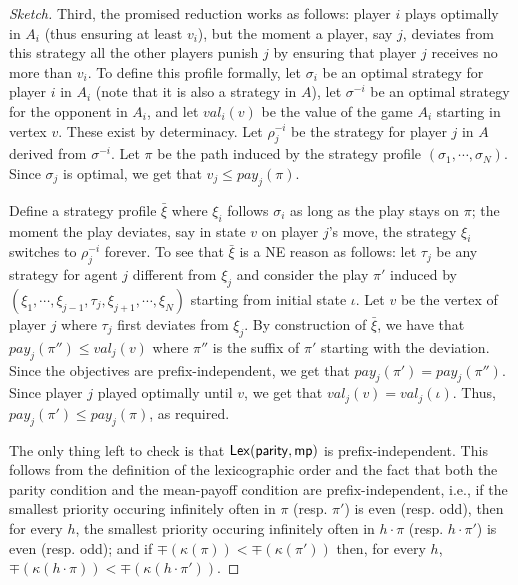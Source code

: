 \begin{proof}[Sketch]
Third, the promised reduction works as follows: player $i$ plays optimally in $A_i$ (thus ensuring at least $v_i$), but the moment a player, say $j$, deviates from this strategy all the other players punish $j$ by ensuring that player $j$ receives no more than $v_i$. To define this profile formally, let 
$\sigma_i$ be an optimal strategy for player $i$ in $A_i$ (note that it is also a strategy in $A$), 
let $\sigma^{-i}$ be an optimal strategy for the opponent in $A_i$, and let 
$val_i(v)$ be the value of the game $A_i$ starting in vertex $v$. These exist by determinacy. 
Let $\rho_j^{-i}$ be the strategy for player $j$ in $A$ derived from $\sigma^{-i}$. Let $\pi$ be the path induced by the strategy profile $(\sigma_1, \cdots, \sigma_N)$. Since $\sigma_j$ is optimal, we get that $v_j \leq pay_j(\pi)$.  

Define a strategy profile $\bar{\xi}$ where $\xi_i$ follows $\sigma_i$ as long as the play stays on $\pi$; the moment the play deviates, say in state $v$ on player $j$'s move, the strategy $\xi_i$ switches to $\rho_j^{-i}$ forever. To see that $\bar{\xi}$ is a NE reason as follows: let $\tau_j$ be any strategy for agent $j$ different from $\xi_j$ and consider the play $\pi'$ induced by $(\xi_1, \cdots, \xi_{j-1}, \tau_j, \xi_{j+1}, \cdots, \xi_N)$ starting from initial state $\iota$. Let $v$ be the vertex of player $j$ where $\tau_j$ first deviates from $\xi_j$. By construction of $\bar{\xi}$, we have that $pay_j(\pi'') \leq val_j(v)$ where $\pi''$ is the suffix of $\pi'$ starting with the deviation. Since the objectives are prefix-independent, we get that
$pay_j(\pi') = pay_j(\pi'')$. Since player $j$ played optimally until $v$, we get that $val_j(v) = val_j(\iota)$. Thus, $pay_j(\pi') \leq pay_j(\pi)$, as required.


The only thing left to check is that ${\sf Lex}({\sf parity},{\sf mp})$ is prefix-independent. This follows from the definition of the lexicographic order and the fact that both the parity condition and the mean-payoff condition are prefix-independent, i.e., if the smallest priority occuring infinitely often in $\pi$ (resp. $\pi'$) is even (resp. odd), then for every $h$, the smallest priority occuring infinitely often in $h \cdot \pi$ (resp. $h \cdot \pi'$) is even (resp. odd); and if $\mp(\kappa(\pi)) < \mp(\kappa(\pi'))$ then, for every $h$, $\mp(\kappa(h \cdot \pi)) < \mp(\kappa(h \cdot \pi'))$. 
\end{proof}
